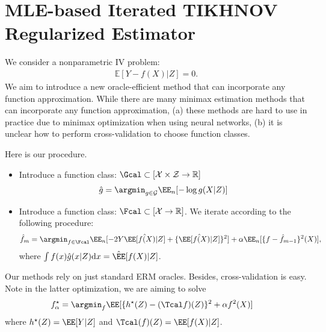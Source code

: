 \documentclass[14pt]{extarticle} %
\begin{document}
\section{MLE-based Iterated TIKHNOV Regularized Estimator}
 We consider a nonparametric IV problem: 
\begin{align}\label{eq:inverse-iv}
    \mathbb{E}[Y-f(X)|Z]=0. 
\end{align}
We aim to introduce a new oracle-efficient method that can incorporate any function approximation. While there are many minimax estimation methods \citep{DikkalaNishanth2020MEoC} that can incorporate any function approximation, (a) these methods are hard to use in practice due to minimax optimization when using neural networks, (b) it is unclear how to perform cross-validation to choose function classes.  

Here is our procedure. 
\begin{itemize}    
    \item Introduce a function class: $\Gcal \subset [\mathcal{X}\times \mathcal{Z} \to \mathbb{R}]$
    \begin{align*}
        \hat g= \argmin_{g \in \mathcal{G}}\EE_n[-\log g(X|Z)]
    \end{align*}
     
    \item Introduce a function class: $\Fcal \subset [\mathcal{X} \to \mathbb{R}]$. We iterate according to the following procedure: 
    \begin{align}\label{eq:main-iter}
         \hat f_m =\argmin_{f \in \Fcal} 
       \EE_n[ - 2Y \hat \EE[f(X)|Z] +   \{\hat \EE[f(X)|Z]\}^2  ]   
         +\alpha \EE_n[\{f-\hat f_{m-1}\}^2(X)],
    \end{align}
     where $\int f(x)\hat g(x|Z)\mathrm{d}x = \mathrm{\hat \EE}[f(X)|Z]$.
\end{itemize}
Our methods rely on just standard ERM oracles. Besides, cross-validation is easy. 
Note in the latter optimization, we are aiming to solve 
\begin{align*}
        f^{\star}_{\alpha} &= \argmin_{f} \EE[\{h^{\star}(Z)  - (\Tcal f)(Z) \}^2 +\alpha f^2(X) ] 
\end{align*}
where $h^{\star}(Z)=\EE[Y|Z]$ and $\Tcal(f)(Z)=\EE[f(X)|Z]$. 
\end{document}
